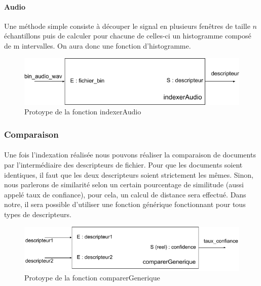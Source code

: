 \documentclass[../main.tex]{subfiles}
\begin{document}
    \paragraph{Audio}
    Une méthode simple consiste à découper le signal en plusieurs fenêtres de taille $n$ échantillons puis de calculer pour chacune de celles-ci un histogramme composé de m intervalles. On aura donc une fonction d’histogramme.

    \begin{figure}[H]
        \centering
        \includegraphics[width=140mm]{diagrams/indexer_audio.png}
        \caption{Protoype de la fonction indexerAudio}
    \end{figure}

    \subsubsection{Comparaison}
    \paragraph{}
    Une fois l’indexation réalisée nous pouvons réaliser la comparaison de documents par l'intermédiaire des descripteurs de fichier. Pour que les documents soient identiques, il faut que les deux descripteurs soient strictement les mêmes. Sinon, nous parlerons de similarité selon un certain pourcentage de similitude (aussi appelé taux de confiance), pour cela, un calcul de distance sera effectué. Dans notre, il sera possible d’utiliser une fonction générique fonctionnant pour tous types de descripteurs.

    \begin{figure}[H]
        \centering
        \includegraphics[width=140mm]{diagrams/fonctions_comparaison.png}
        \caption{Protoype de la fonction comparerGenerique}
    \end{figure}
\end{document}
